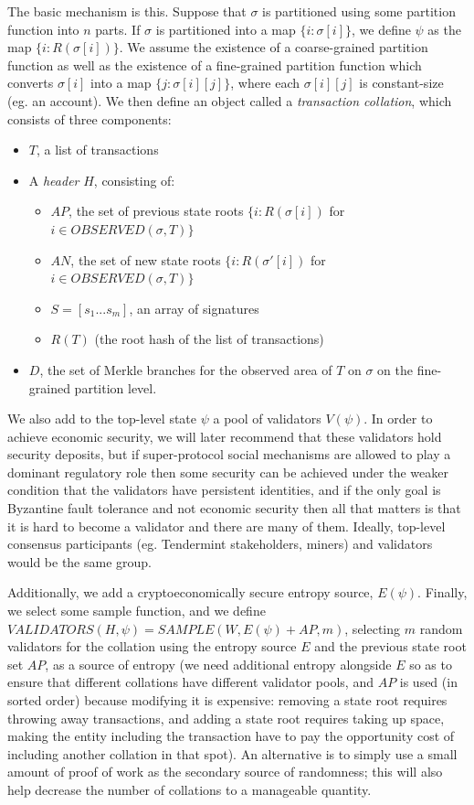 \documentclass[11pt,a4paper]{article}
\theoremstyle{plain}
\theoremstyle{definition}
\theoremstyle{remark}
\begin{document}
The basic mechanism is this. Suppose that $\sigma$ is partitioned using some partition function into $n$ parts. If $\sigma$ is partitioned into a map $\{i: \sigma[i]\}$, we define $\psi$ as the map $\{i: R(\sigma[i])\}$. We assume the existence of a coarse-grained partition function as well as the existence of a fine-grained partition function which converts $\sigma[i]$ into a map $\{j: \sigma[i][j]\}$, where each $\sigma[i][j]$ is constant-size (eg. an account). We then define an object called a \emph{transaction collation}, which consists of three components:

\begin{itemize}
\item
$T$, a list of transactions
\item
A \emph{header} $H$, consisting of:
    \begin{itemize}
    \item
    $AP$, the set of previous state roots $\{i: R(\sigma[i])$ for $i \in OBSERVED(\sigma, T)\}$
    \item
    $AN$, the set of new state roots $\{i: R(\sigma'[i])$ for $i \in OBSERVED(\sigma, T)\}$
    \item
    $S = [s_1 ... s_m]$, an array of signatures
    \item
    $R(T)$ (the root hash of the list of transactions)
    \end{itemize}
\item
$D$, the set of Merkle branches for the observed area of $T$ on $\sigma$ on the fine-grained partition level.
\end{itemize}

We also add to the top-level state $\psi$ a pool of validators $V(\psi)$. In order to achieve economic security, we will later recommend that these validators hold security deposits, but if super-protocol social mechanisms are allowed to play a dominant regulatory role then some security can be achieved under the weaker condition that the validators have persistent identities, and if the only goal is Byzantine fault tolerance and not economic security then all that matters is that it is hard to become a validator and there are many of them. Ideally, top-level consensus participants (eg. Tendermint stakeholders, miners) and validators would be the same group.

Additionally, we add a cryptoeconomically secure entropy source, $E(\psi)$. Finally, we select some sample function, and we define $VALIDATORS(H, \psi) = SAMPLE(W, E(\psi) + AP, m)$, selecting $m$ random validators for the collation using the entropy source $E$ and the previous state root set $AP$, as a source of entropy (we need additional entropy alongside $E$ so as to ensure that different collations have different validator pools, and $AP$ is used (in sorted order) because modifying it is expensive: removing a state root requires throwing away transactions, and adding a state root requires taking up space, making the entity including the transaction have to pay the opportunity cost of including another collation in that spot). An alternative is to simply use a small amount of proof of work as the secondary source of randomness; this will also help decrease the number of collations to a manageable quantity.
\end{document}
